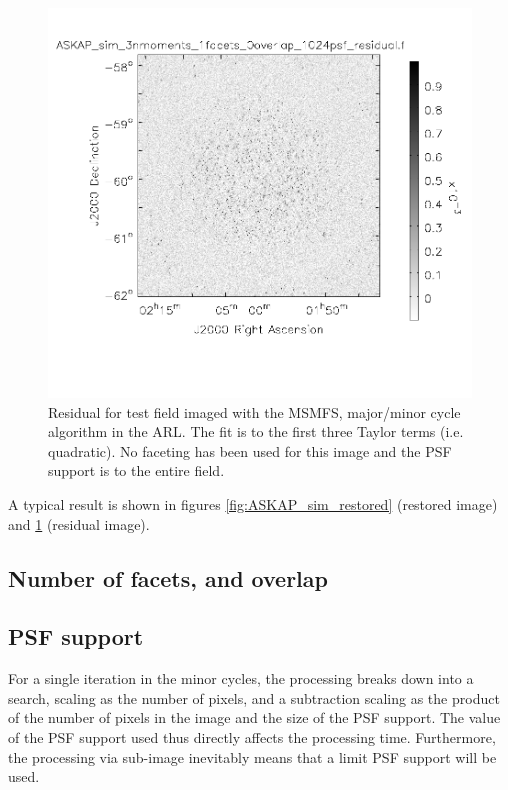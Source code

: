 \documentclass[11pt,a4paper,variablewidth]{article}
\begin{document}
\begin{figure}[H]
  \centering
  \includegraphics[width=\textwidth]{./ASKAP_sim_residual.png}
  \caption{Residual for test field imaged with the MSMFS, major/minor cycle algorithm in the ARL. The fit is to the first three Taylor terms (i.e. quadratic). No faceting has been used for this image and the PSF support is to the entire field.}
  \label{fig:ASKAP_sim_residual}
\end{figure}

A typical result is shown in figures \ref{fig:ASKAP_sim_restored} (restored image) and \ref{fig:ASKAP_sim_residual} (residual image).

\subsection{Number of facets, and overlap}


\subsection{PSF support}

For a single iteration in the minor cycles, the processing breaks down into a search, scaling as the number of pixels, and a subtraction scaling as the product of the number of pixels in the image and the size of the PSF support. The value of the PSF support used thus directly affects the processing time. Furthermore, the processing via sub-image inevitably means that a limit PSF support will be used.
\end{document}
